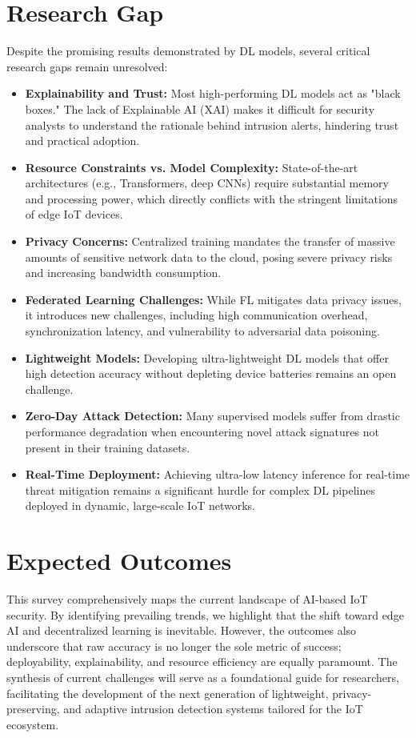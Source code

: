 \documentclass[conference]{IEEEtran}
\begin{document}
\section{Research Gap}
Despite the promising results demonstrated by DL models, several critical research gaps remain unresolved:
\begin{itemize}
    \item \textbf{Explainability and Trust:} Most high-performing DL models act as "black boxes." The lack of Explainable AI (XAI) \cite{rahman2022} makes it difficult for security analysts to understand the rationale behind intrusion alerts, hindering trust and practical adoption.
    \item \textbf{Resource Constraints vs. Model Complexity:} State-of-the-art architectures (e.g., Transformers, deep CNNs) require substantial memory and processing power, which directly conflicts with the stringent limitations of edge IoT devices.
    \item \textbf{Privacy Concerns:} Centralized training mandates the transfer of massive amounts of sensitive network data to the cloud, posing severe privacy risks and increasing bandwidth consumption.
    \item \textbf{Federated Learning Challenges:} While FL mitigates data privacy issues, it introduces new challenges, including high communication overhead, synchronization latency, and vulnerability to adversarial data poisoning.
    \item \textbf{Lightweight Models:} Developing ultra-lightweight DL models that offer high detection accuracy without depleting device batteries remains an open challenge.
    \item \textbf{Zero-Day Attack Detection:} Many supervised models suffer from drastic performance degradation when encountering novel attack signatures not present in their training datasets.
    \item \textbf{Real-Time Deployment:} Achieving ultra-low latency inference for real-time threat mitigation remains a significant hurdle for complex DL pipelines deployed in dynamic, large-scale IoT networks.
\end{itemize}

\section{Expected Outcomes}
This survey comprehensively maps the current landscape of AI-based IoT security. By identifying prevailing trends, we highlight that the shift toward edge AI and decentralized learning is inevitable. However, the outcomes also underscore that raw accuracy is no longer the sole metric of success; deployability, explainability, and resource efficiency are equally paramount. The synthesis of current challenges will serve as a foundational guide for researchers, facilitating the development of the next generation of lightweight, privacy-preserving, and adaptive intrusion detection systems tailored for the IoT ecosystem.
\end{document}
